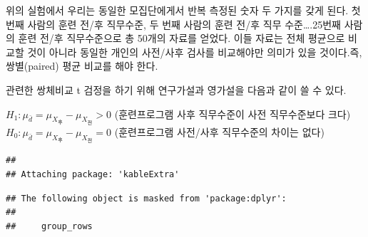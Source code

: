 \documentclass[
]{book}
\begin{document}
위의 실험에서 우리는 동일한 모집단에게서 반복 측정된 숫자 두 가지를 갖게 된다. 첫번째 사람의 훈련 전/후 직무수준, 두 번째 사람의 훈련 전/후 직무 수준\ldots.25번째 사람의 훈련 전/후 직무수준으로 총 50개의 자료를 얻었다. 이들 자료는 전체 평균으로 비교할 것이 아니라 동일한 개인의 사전/사후 검사를 비교해야만 의미가 있을 것이다.즉,쌍별(paired) 평균 비교를 해야 한다.

관련한 쌍체비교 t 검정을 하기 위해 연구가설과 영가설을 다음과 같이 쓸 수 있다.

\(H_1: \mu_{\bar{d}}=\mu_{X_{후}}-\mu_{X_{전}}>0\) (훈련프로그램 사후 직무수준이 사전 직무수준보다 크다)
\(H_0: \mu_{\bar{d}}=\mu_{X_{후}}-\mu_{X_{전}}=0\) (훈련프로그램 사전/사후 직무수준의 차이는 없다)

\begin{verbatim}
## 
## Attaching package: 'kableExtra'
\end{verbatim}

\begin{verbatim}
## The following object is masked from 'package:dplyr':
## 
##     group_rows
\end{verbatim}
\end{document}
